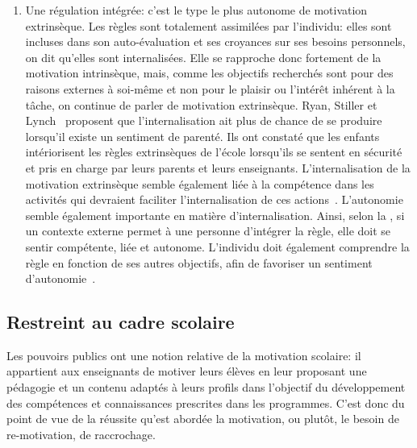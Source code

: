 \begin{enumerate}
                    \item Une régulation intégrée: c'est le type le plus autonome de motivation extrinsèque. Les règles sont totalement assimilées par l'individu: elles sont incluses dans son auto-évaluation et ses croyances sur ses besoins personnels, on dit qu'elles sont internalisées. Elle se rapproche donc fortement de la motivation intrinsèque, mais, comme les objectifs recherchés sont pour des raisons externes à soi-même et non pour le plaisir ou l'intérêt inhérent à la tâche, on continue de parler de motivation extrinsèque. Ryan, Stiller et Lynch~ proposent que l'internalisation ait plus de chance de se produire lorsqu'il existe un sentiment de parenté. Ils ont constaté que les enfants intériorisent les règles extrinsèques de l'école lorsqu'ils se sentent en sécurité et pris en charge par leurs parents et leurs enseignants. L'internalisation de la motivation extrinsèque semble également liée à la compétence dans les activités qui devraient faciliter l'internalisation de ces actions~. L'autonomie semble également importante en matière d'internalisation. Ainsi, selon la , si un contexte externe permet à une personne d’intégrer la règle, elle doit se sentir compétente, liée et autonome. L'individu doit également comprendre la règle en fonction de ses autres objectifs, afin de favoriser un sentiment d'autonomie~. %
                \end{enumerate}
        \subsection{Restreint au cadre scolaire}
            Les pouvoirs publics ont une notion relative de la motivation scolaire: il appartient aux enseignants de motiver leurs élèves en leur proposant une pédagogie et un contenu adaptés à leurs profils dans l'objectif du développement des compétences et connaissances prescrites dans les programmes. C'est donc du point de vue de la réussite  qu'est abordée la motivation, ou plutôt, le besoin de re-motivation, de raccrochage.
